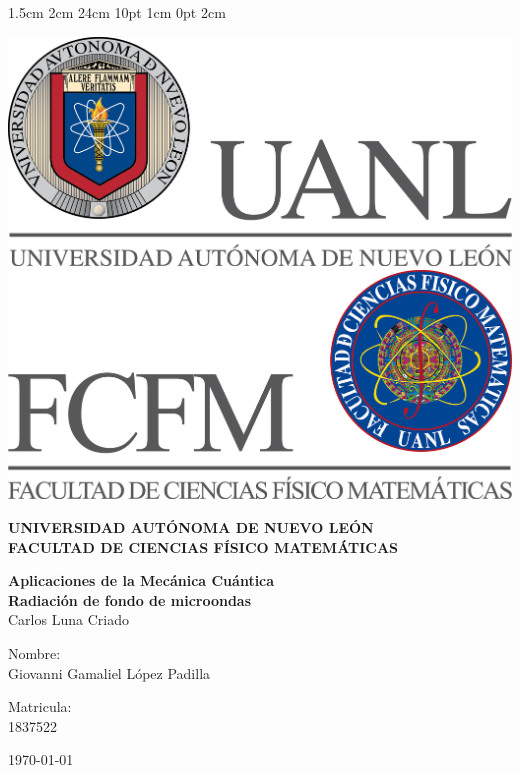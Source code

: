 \documentclass[12pt,letterpaper]{article}
\begin{document}
\setmargins{2.5cm}      
{1.5cm}                     
{2cm}  
{24cm}                    
{10pt}                          
{1cm}                          
{0pt}                             
{2cm}
\begin{titlepage}
\begin{center}
\includegraphics[scale=0.40]{../../../Logos/uanl.png} 
\hspace{2.5cm}
\includegraphics[scale=0.40]{../../../Logos/fcfm.png}
\end{center}
\vspace{2cm}
\begin{center}
\textbf{
UNIVERSIDAD AUTÓNOMA DE NUEVO LEÓN\\
FACULTAD DE CIENCIAS
FÍSICO MATEMÁTICAS}\\
\vspace*{2cm}
\begin{large}
\vspace{1cm}
\large{\textbf{Aplicaciones de la Mecánica Cuántica}}\\
\textbf{Radiación de fondo de microondas}\\
Carlos Luna Criado\\
\end{large}
\vspace{3.5cm}
\begin{minipage}{0.6\linewidth}
\vspace{0.5cm}
\changefontsizes{14pt}
Nombre:\\
Giovanni Gamaliel López Padilla\\
\end{minipage}
\begin{minipage}{0.2\linewidth}
\changefontsizes{14pt}
Matricula:\\
1837522
\end{minipage}
\end{center}
\vspace{4cm}
\begin{flushright}
\today
\end{flushright}
\end{titlepage}
\end{document}
